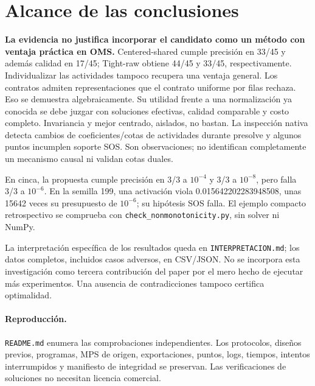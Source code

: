 \documentclass[10pt,a4paper]{article}
\begin{document}
\section{Alcance de las conclusiones}
\textbf{La evidencia no justifica incorporar el candidato como un método con
ventaja práctica en OMS.} Centered-shared cumple precisión en 33/45 y además
calidad en 17/45; Tight-raw obtiene 44/45 y 33/45, respectivamente.
Individualizar las actividades tampoco recupera una ventaja general.
Los contratos admiten representaciones que el contrato uniforme por filas
rechaza. Eso se demuestra algebraicamente. Su utilidad frente a una
normalización ya conocida se debe juzgar con soluciones efectivas, calidad
comparable y costo completo. Invariancia y mejor centrado, aislados, no bastan.
La inspección nativa detecta cambios de coeficientes/cotas de actividades durante
presolve y algunos puntos incumplen soporte SOS. Son observaciones; no
identifican completamente un mecanismo causal ni validan cotas duales.

En cinca, la propuesta cumple precisión en 3/3 a $10^{-4}$ y 3/3 a $10^{-8}$,
pero falla 3/3 a $10^{-6}$. En la semilla 199, una activación viola
0.015642202283948508, unas 15642 veces su presupuesto de $10^{-6}$;
su hipótesis SOS falla. El ejemplo compacto retrospectivo se comprueba con
\texttt{check\_nonmonotonicity.py}, sin solver ni NumPy.

La interpretación específica de los resultados queda en \texttt{INTERPRETACION.md};
los datos completos, incluidos casos adversos, en CSV/JSON. No se incorpora esta
investigación como tercera contribución del paper por el mero hecho de ejecutar
más experimentos. Una ausencia de contradicciones tampoco certifica optimalidad.

\paragraph{Reproducción.} \texttt{README.md} enumera las comprobaciones independientes.
Los protocolos, diseños previos, programas, MPS de origen, exportaciones, puntos,
logs, tiempos, intentos interrumpidos y manifiesto de integridad se preservan.
Las verificaciones de soluciones no necesitan licencia comercial.
\end{document}
